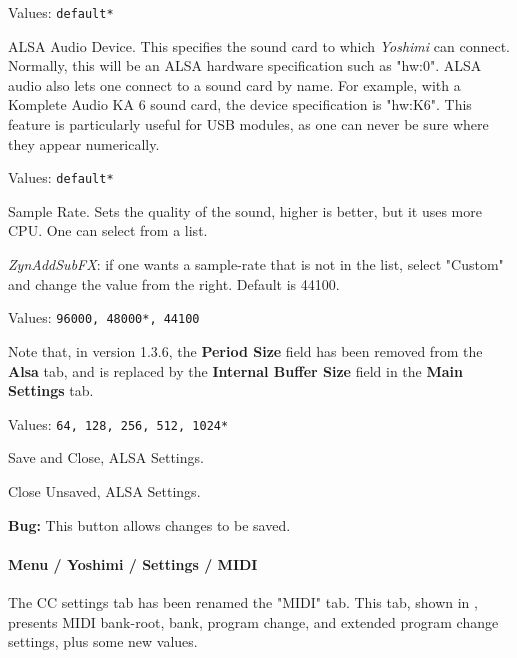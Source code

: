    Values: \texttt{default*}

   ALSA Audio Device.
   This specifies the sound card to which \textsl{Yoshimi} can connect.
   Normally, this will be an ALSA hardware specification such as
   "hw:0".
   ALSA audio also lets one connect to a sound card by name. For example,
   with a Komplete Audio KA 6 sound card, the device specification is
   "hw:K6". This feature is particularly useful for USB modules, as one can
   never be sure where they appear numerically.

   Values: \texttt{default*}

   Sample Rate.
   Sets the quality of the sound, higher is better, but it uses more CPU.
   One can select from a list.
   
   \textsl{ZynAddSubFX}: if one wants a sample-rate that
   is not in the list, select "Custom" and change the value from the right.
   Default is 44100.

   Values: \texttt{96000, 48000*, 44100}

   Note that, in version 1.3.6, the \textbf{Period Size} field has been
   removed from the \textbf{Alsa} tab, and is replaced by the 
   \textbf{Internal Buffer Size} field in the \textbf{Main Settings} tab.


   Values: \texttt{64, 128, 256, 512, 1024*}

   Save and Close, ALSA Settings.

   Close Unsaved, ALSA Settings.

   \textbf{Bug:}
   This button allows changes to be saved.

\paragraph{Menu / Yoshimi / Settings / MIDI}
\label{paragraph:menu_yoshimi_settings_ccs}

   The CC settings tab has been renamed the "MIDI" tab.
   This tab, shown in
   ,
   presents MIDI bank-root, bank, program change, and extended program
   change settings, plus some new values.

